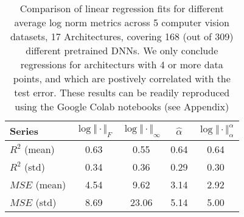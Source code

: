 \begin{table}[t]
\small
\begin{center}
\begin{tabular}{|p{0.75in}|c|c|c|c|}
\hline
Series        & $\log\Vert\cdot\Vert_{F}$ & $\log\Vert\cdot\Vert_{\infty}$ & $\hat{\alpha}$ & $\log\Vert\cdot\Vert^{\alpha}_{\alpha}$ \\
\hline
$R^{2}$ (mean) & 0.63 &0.55 &0.64 &0.64 \\
$R^{2}$ (std)  & 0.34 &0.36 &0.29 &0.30 \\
\hline
$MSE$ (mean)   & 4.54 &9.62 &3.14 &2.92 \\
$MSE$ (std)    & 8.69 &23.06 &5.14 &5.00 \\
\hline
\end{tabular}
\end{center}
\caption{Comparison of linear regression fits for different average log norm metrics across 5 computer vision datasets, 17 Architectures, covering 168 (out of 309) different pretrained DNNs.  We only conclude regressions for architecturs with 4 or more data points, and which are postively correlated with the test error.  These results can be readily reproduced using the Google Colab notebooks (see Appendix)}
\label{table:results}
\end{table}



